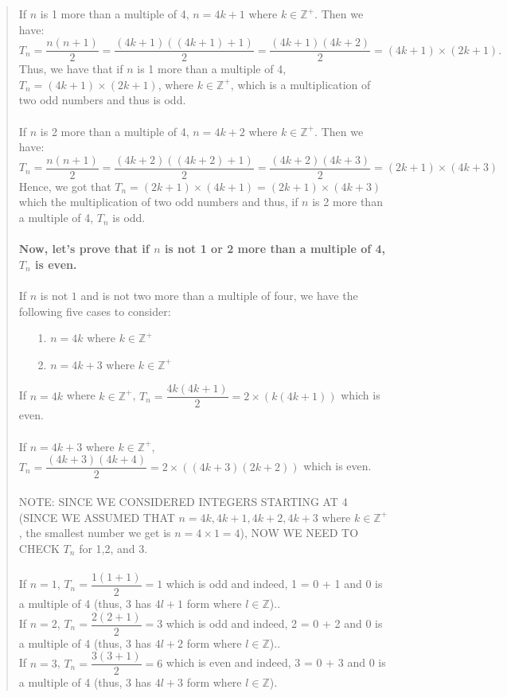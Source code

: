 \documentclass[12pt, a4paper]{article}                      %
\newcommand{\intz}{\mathbb{Z}}
\newcommand{\intzp}{\mathbb{Z^+}}
\begin{document}
\begin{itemize}
\begin{quote}
If $n$ is 1 more than a multiple of 4, $n = 4k + 1$ where $k \in \intzp$. Then we have:
$$T_n = \dfrac{n(n+1)}{2} = \dfrac{(4k + 1)((4k + 1) + 1)}{2} = \dfrac{(4k + 1)(4k + 2)}{2} = (4k + 1) \times (2k + 1).$$
Thus, we have that if $n$ is 1 more than a multiple of 4, $T_n = (4k + 1) \times (2k + 1)$, where $k \in \intzp$, which is a multiplication of two
odd numbers and thus is odd.
\\\\
If $n$ is 2 more than a multiple of 4, $n = 4k + 2$ where $k \in \intzp$. Then we have:
$$T_n = \dfrac{n(n+1)}{2} = \dfrac{(4k + 2)((4k + 2) + 1)}{2} = \dfrac{(4k + 2)(4k + 3)}{2} = (2k + 1) \times (4k + 3)$$
Hence, we got that $T_n = (2k + 1) \times (4k + 1) = (2k + 1) \times (4k + 3)$ which the multiplication of two odd
numbers and thus, if $n$ is 2 more than a multiple of 4, $T_n$ is odd.
\\\\
\textbf{Now, let's prove that if $n$ is not 1 or 2 more than a multiple of 4, $T_n$ is even.}\\\\
If $n$ is not $1$ and is not two more than a multiple of four, we have the following five cases to consider:
\begin{itemize}
\item[1.]
$n = 4k$ where $k \in \intzp$
\item[2.]
$n = 4k + 3$ where $k \in \intzp$
\end{itemize}
If $n = 4k$ where $k \in \intzp$, $T_n = \dfrac{4k(4k+1)}{2} = 2 \times (k(4k + 1))$ which is even.
\\\\
If $n = 4k + 3$ where $k \in \intzp$, $T_n = \dfrac{(4k+3)(4k+4)}{2} = 2 \times ((4k + 3)(2k + 2))$ which is even.
\\\\
NOTE: SINCE WE CONSIDERED INTEGERS STARTING AT 4 (SINCE WE ASSUMED THAT $n = 4k,4k+1,4k+2,4k+3$ where $k \in \intzp$,
the smallest number we get is $n = 4 \times 1 = 4$), NOW WE NEED TO CHECK $T_n$ for 1,2, and 3.
\\\\
If $n = 1$, $T_n = \dfrac{1(1+1)}{2} = 1$ which is odd and indeed, 1 = 0 + 1 and 0 is a multiple of 4 (thus, 3 has $4l + 1$ form where $l \in \intz$)..
\\
If $n = 2$, $T_n = \dfrac{2(2+1)}{2} = 3$ which is odd and indeed, 2 = 0 + 2 and 0 is a multiple of 4 (thus, 3 has $4l + 2$ form where $l \in \intz$)..
\\
If $n = 3$, $T_n = \dfrac{3(3+1)}{2} = 6$ which is even and indeed, 3 = 0 + 3 and 0 is a multiple of 4 (thus, 3 has $4l + 3$ form where $l \in \intz$).

\end{quote}
\end{itemize}
\end{document}
